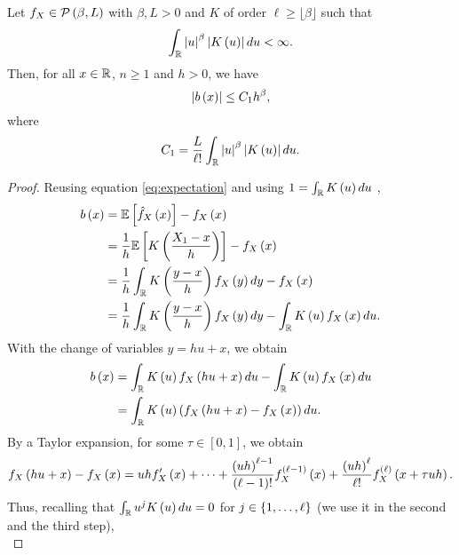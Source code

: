 \begin{proposition}\label{prop:2}
Let $f_X\in \mathcal{P}\left(\beta,L\right)$ with $\beta,L >0$ and $K$ of order $\ell \geq \lfloor \beta \rfloor$ such that
\begin{equation*}
  \int_{\mathbb{R}} \left| u\right|^\beta \left| K\left(u\right)\right|du <\infty.
\end{equation*}
Then, for all $x\in\mathbb{R}$, $n\geq 1$ and $h>0$, we have
\begin{equation*}
  \left| b\left(x\right)\right|\leq C_1 h^\beta,
\end{equation*}
where
\begin{equation*}
  C_1 = \frac{L}{\ell !}\int_{\mathbb{R}}\left| u\right|^{\beta} \left| K\left(u\right)\right| du.
\end{equation*}
\end{proposition}
\begin{proof}
Reusing equation \ref{eq:expectation} and using $1= \int_{\mathbb{R}} K\left(u\right)du$ ,
  \begin{equation*}
    \begin{split}
      b\left(x\right) &= \mathbb{E}\left[\hat{f}_X\left(x\right)\right] - f_X\left(x\right) \\
      &= \frac{1}{h}\mathbb{E}\left[K\left(\frac{X_1-x}{h}\right)\right] - f_X\left(x\right) \\
      &= \frac{1}{h}\int_{\mathbb{R}} K\left(\frac{y-x}{h}\right) f_X\left(y\right)dy - f_X\left(x\right)\\
      &= \frac{1}{h}\int_{\mathbb{R}} K\left(\frac{y-x}{h}\right) f_X\left(y\right)dy - \int_{\mathbb{R}} K\left(u\right) f_X\left(x\right) du.
    \end{split}
  \end{equation*}
  With the change of variables $y = hu + x$, we obtain
  \begin{equation*}
    \begin{split}
      b\left(x\right) &= \int_{\mathbb{R}} K\left(u\right) f_X\left(hu+x\right)du - \int_{\mathbb{R}} K\left(u\right) f_X\left(x\right) du \\
      &= \int_{\mathbb{R}} K\left(u\right) \left(f_X\left(hu +x\right) - f_X\left(x\right)\right) du.
    \end{split}
  \end{equation*}
  By a Taylor expansion, for some $\tau \in [0,1]$, we obtain
  \begin{equation*}
    f_X\left(hu+x\right) - f_X\left(x\right) = uh f_X'\left(x\right) + \cdots  + \frac{\left(uh\right)^{\ell -1}}{\left(\ell -1\right)!} f_X^{\left(\ell -1\right)}\left(x\right)+ \frac{\left(uh\right)^\ell}{\ell !}f_X^{\left(\ell\right)}\left(x+\tau uh \right).
  \end{equation*}
  Thus, recalling that $\int_{\mathbb{R}} u^j K\left(u\right) du = 0$ for $j\in \left\{1,\ldots, \ell\right\}$ (we use it in the second and the third step),
  \begin{equation*}

\end{equation*}
\end{proof}
